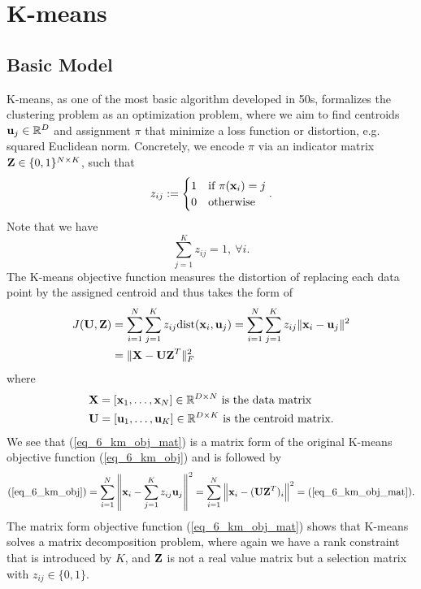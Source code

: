 \documentclass[../book-template.tex]{subfiles}
\begin{document}
\section{K-means}
\subsection{Basic Model}
K-means, as one of the most basic algorithm developed in 50s, formalizes the clustering problem as an optimization problem, where we aim to find centroids ${\bf u}_j\in\mathbb{R}^D$ and assignment $\pi$ that minimize a loss function or distortion, e.g. squared Euclidean norm. Concretely, we encode $\pi$ via an indicator matrix ${\bf Z}\in \{0,1\}^{N\times K}$, such that
\begin{equation*}
	z_{ij}:=\begin{cases}
	1&\text{if }\pi({\bf x}_i)=j\\
	0&\text{otherwise}
	\end{cases}.
\end{equation*}
Note that we have
\begin{equation*}
	\sum_{j=1}^{K} z_{ij} = 1,\ \forall i.
\end{equation*}
The K-means objective function measures the distortion of replacing each data point by the assigned centroid and thus takes the form of
\begin{align}
	\label{eq_6_km_obj}J({\bf U, Z})&=\sum_{i=1}^{N}\sum_{j=1}^{K} z_{ij}{\rm dist}({\bf x}_i, {\bf u}_j)=\sum_{i=1}^{N}\sum_{j=1}^{K} z_{ij}\|{\bf x}_i-{\bf u}_j\|^2\\
	\label{eq_6_km_obj_mat}&=\|{\bf X-UZ}^T\|^2_F
\end{align}
where
\begin{align*}
	&{\bf X} = [{\bf x}_1,\dots,{\bf x}_N]\in \mathbb{R}^{D\times N}\ \text{is the data matrix}\\
	&{\bf U} = [{\bf u}_1,\dots,{\bf u}_K]\in \mathbb{R}^{D\times K}\ \text{is the centroid matrix.}
\end{align*}
We see that (\ref{eq_6_km_obj_mat}) is a matrix form of the original K-means objective function (\ref{eq_6_km_obj}) and is followed by
\begin{equation*}
	(\ref{eq_6_km_obj}) = \sum_{i=1}^{N}\left\|{\bf x}_i-\sum_{j=1}^{K} z_{ij}{\bf u}_j\right\|^2 =  \sum_{i=1}^{N}\left\|{\bf x}_i-({\bf UZ}^T)_i\right\|^2 =(\ref{eq_6_km_obj_mat}).
\end{equation*}
The matrix form objective function (\ref{eq_6_km_obj_mat}) shows that K-means solves a matrix decomposition problem, where again we have a rank constraint that is introduced by $K$, and ${\bf Z}$ is not a real value matrix but a selection matrix with $z_{ij}\in\{0,1\}$.
\end{document}
